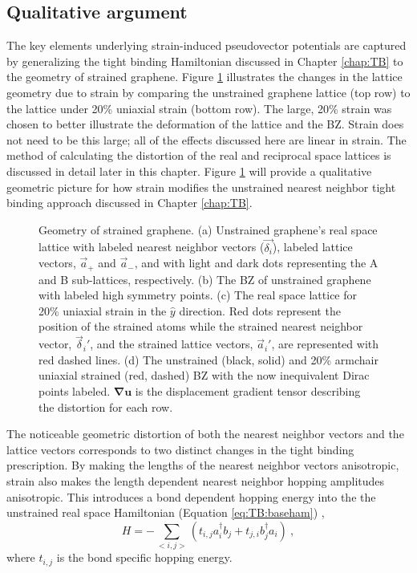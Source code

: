 \subsection{Qualitative argument}
The key elements underlying strain-induced pseudovector potentials are captured by generalizing the tight binding Hamiltonian discussed in Chapter \ref{chap:TB} to the geometry of strained graphene.
Figure \ref{fig:PVP:lattice} illustrates the changes in the lattice geometry due to strain by comparing the unstrained graphene lattice (top row) to the lattice under 20\% uniaxial strain (bottom row).
The large, 20\% strain was chosen to better illustrate the deformation of the lattice and the BZ.
Strain does not need to be this large; all of the effects discussed here are linear in strain.
The method of calculating the distortion of the real and reciprocal space lattices is discussed in detail later in this chapter.
Figure \ref{fig:PVP:lattice} will provide a qualitative geometric picture for how strain modifies the unstrained nearest neighbor tight binding approach discussed in Chapter \ref{chap:TB}.

\begin{figure}
  
  \caption[Geometry of strained graphene]{\label{fig:PVP:lattice} Geometry of strained graphene.  (a) Unstrained graphene's real space lattice with labeled nearest neighbor vectors ($\vec{\delta_i}$), labeled lattice vectors, $\vec{a}_+$ and  $\vec{a}_-$, and with light and dark dots representing the A and B sub-lattices, respectively. (b) The BZ of unstrained graphene with labeled high symmetry points. (c) The real space lattice for 20\% uniaxial strain in the $\hat{y}$ direction.  Red dots represent the position of the strained atoms while the strained nearest neighbor vector, $\vec{\delta}_i'$, and the strained lattice vectors, $\vec{a}_i'$, are represented with red dashed lines.  (d) The unstrained (black, solid) and 20\% armchair uniaxial strained (red, dashed) BZ with the now inequivalent Dirac points labeled.  $\bm{\nabla u}$ is the displacement gradient tensor describing the distortion for each row.}
\end{figure}

The noticeable geometric distortion of both the nearest neighbor vectors and the lattice vectors corresponds to two distinct changes in the tight binding prescription.
By making the lengths of the nearest neighbor vectors anisotropic, strain also makes the length dependent nearest neighbor hopping amplitudes anisotropic.
This introduces a bond dependent hopping energy into the the unstrained real space Hamiltonian (Equation \ref{eq:TB:baseham}) \cite{Hasegawa2006},
\begin{equation}
  H=-\sum_{<i,j>} \left( t_{i,j} a_i^{\dagger} b_j + t_{j,i} b_j^{\dagger} a_i \right) \ ,
  \label{eq:PVP:RealSpace}
\end{equation}
where $t_{i,j}$ is the bond specific hopping energy.

